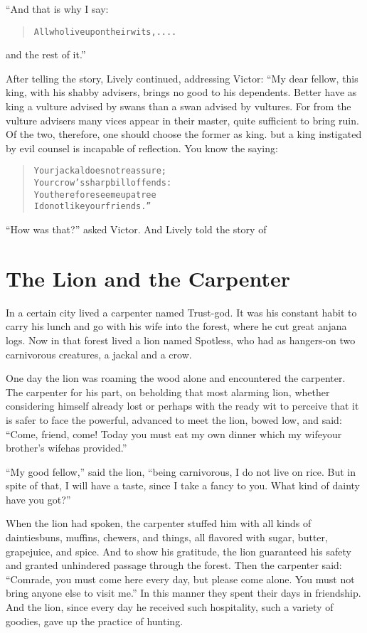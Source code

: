 \documentclass[article, twoside, 14pt]{memoir}
\renewenvironment{verbatim}{%
\begin{quote}%
\vskip -10pt%
\begin{alltt}\normalfont\large}{\end{alltt}%
\end{quote}%
\vskip -10pt
} %
\begin{document}
“And that is why I say:

\begin{verbatim}
All who live upon their wits,....
\end{verbatim}
and the rest of it.”

After telling the story, Lively continued, addressing Victor: “My
dear fellow, this king, with his shabby advisers, brings no good to
his dependents. Better have as king a vulture advised by swans than
a swan advised by vultures. For from the vulture advisers many
vices appear in their master, quite sufficient to bring ruin. Of
the two, therefore, one should choose the former as king. but a
king instigated by evil counsel is incapable of reflection. You
know the saying:

\begin{verbatim}
Your jackal does not reassure;
    Your crow's sharp bill offends:
You therefore see me up a tree{\textemdash}
    I do not like your friends.”
\end{verbatim}
``How was that?'' asked Victor. And Lively told the story of

\chapter{The Lion and the Carpenter}

\label{s17}

In a certain city lived a carpenter named Trust-god. It was his
constant habit to carry his lunch and go with his wife into the
forest, where he cut great anjana logs. Now in that forest lived a
lion named Spotless, who had as hangers-on two carnivorous
creatures, a jackal and a crow.

One day the lion was roaming the wood alone and encountered the
carpenter. The carpenter for his part, on beholding that most
alarming lion, whether considering himself already lost or perhaps
with the ready wit to perceive that it is safer to face the
powerful, advanced to meet the lion, bowed low, and said:
``Come, friend, come! Today you must eat my own dinner which my wife{\textemdash}your brother's wife{\textemdash}has provided.''

``My good fellow,'' said the lion,
``being carnivorous, I do not live on rice. But in spite of that, I will have a taste, since I take a fancy to you. What kind of dainty have you got?''

When the lion had spoken, the carpenter stuffed him with all kinds
of dainties{\textemdash}buns, muffins, chewers, and things, all flavored with
sugar, butter, grapejuice, and spice. And to show his gratitude,
the lion guaranteed his safety and granted unhindered passage
through the forest. Then the carpenter said:
``Comrade, you must come here every day, but please come alone. You must not bring anyone else to visit me.''
In this manner they spent their days in friendship. And the lion,
since every day he received such hospitality, such a variety of
goodies, gave up the practice of hunting.
\end{document}
